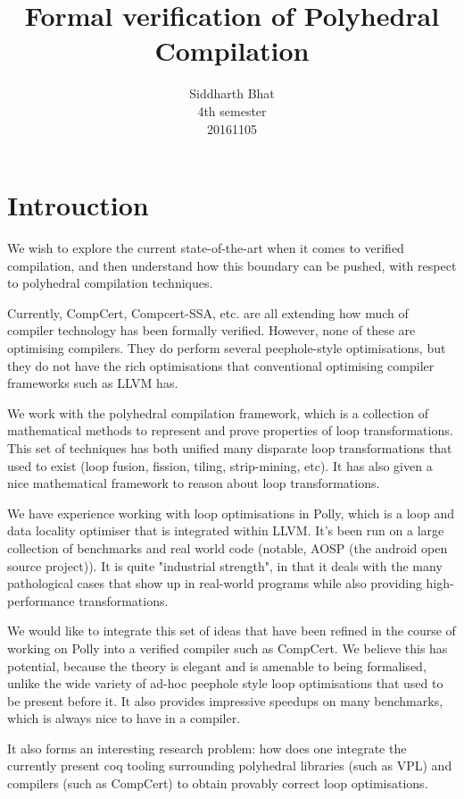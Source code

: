 \documentclass{article}
\title{Formal verification of Polyhedral Compilation}
\author{Siddharth Bhat \\ 4th semester \\ 20161105}
\begin{document}
\maketitle

\newpage
\tableofcontents
\newpage

\section{Introuction}
We wish to explore the current state-of-the-art when it comes to verified compilation, and then understand
how this boundary can be pushed, with respect to polyhedral compilation techniques.

Currently, CompCert, Compcert-SSA, etc. are all extending how much of compiler technology has been formally verified. However, none of these are optimising compilers. They do perform several peephole-style optimisations, but they do not have the rich optimisations that conventional optimising compiler frameworks such as LLVM has.

We work with the polyhedral compilation framework, which is a collection of mathematical methods to represent and prove properties of loop transformations. This set of techniques has both unified many disparate loop transformations that used to exist (loop fusion, fission, tiling, strip-mining, etc). It has also given a nice mathematical framework to reason about loop transformations.

We have experience working with loop optimisations in Polly, which is a loop and data locality optimiser that is integrated within LLVM. It's been run on a large collection of benchmarks and real world code (notable, AOSP (the android open source project)). It is quite "industrial strength", in that it deals with the many pathological cases that show up in real-world programs while also providing high-performance transformations.

We would like to integrate this set of ideas that have been refined in the course of working on Polly into a verified compiler such as CompCert. We believe this has potential, because the theory is elegant and is amenable to being formalised, unlike the wide variety of ad-hoc peephole style loop optimisations that used to be present before it. It also provides impressive speedups on many benchmarks, which is always nice to have in a compiler.

It also forms an interesting research problem: how does one integrate the currently present coq tooling surrounding polyhedral libraries (such as VPL) and compilers (such as CompCert) to obtain provably correct loop optimisations.
\end{document}
